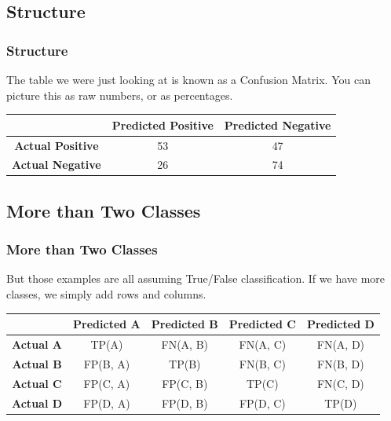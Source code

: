\documentclass[aspectratio=169]{beamer} %
\begin{document}
	\subsection{Structure}
	\begin{frame}
		\frametitle{Structure}
		The table we were just looking at is known as a Confusion Matrix.  You can picture this as raw numbers, or as percentages.

		\begin{center}
			\begin{tabular}{|c|c|c|}
				\hline
				& \textbf{Predicted Positive} & \textbf{Predicted Negative} \\
				\hline
				\textbf{Actual Positive} & 53 & 47 \\
				\hline
				\textbf{Actual Negative} & 26 & 74 \\
				\hline
			\end{tabular}
		\end{center}
	\end{frame}

	\subsection{More than Two Classes}
	\begin{frame}
		\frametitle{More than Two Classes}
		But those examples are all assuming True/False classification.  If we have more classes, we simply add rows and columns.

		\begin{center}
			\begin{tabular}{|c|c|c|c|c|}
				\hline
				& \textbf{Predicted A} & \textbf{Predicted B} & \textbf{Predicted C} & \textbf{Predicted D}\\
				\hline
				\textbf{Actual A} & TP(A) & FN(A, B) & FN(A, C) & FN(A, D) \\
				\hline
				\textbf{Actual B} & FP(B, A) & TP(B) & FN(B, C) & FN(B, D) \\
				\hline
				\textbf{Actual C} & FP(C, A) & FP(C, B) & TP(C) & FN(C, D) \\
				\hline
				\textbf{Actual D} & FP(D, A) & FP(D, B) & FP(D, C) & TP(D) \\
				\hline
			\end{tabular}
		\end{center}
	\end{frame}
\end{document}
